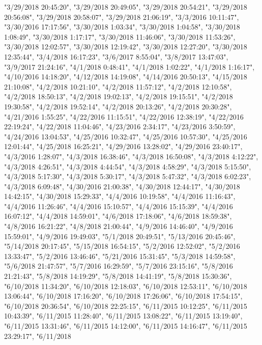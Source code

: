 \documentclass[]{article}
\begin{document}
\begin{itemize}
  "3/29/2018 20:45:20", "3/29/2018 20:49:05", "3/29/2018 20:54:21",
  "3/29/2018 20:56:08", "3/29/2018 20:58:07", "3/29/2018 21:06:19",
  "3/3/2016 10:11:47", "3/30/2016 17:17:56", "3/30/2018 1:03:34",
  "3/30/2018 1:04:58", "3/30/2018 1:08:49", "3/30/2018 1:17:17",
  "3/30/2018 11:46:06", "3/30/2018 11:53:26", "3/30/2018 12:02:57",
  "3/30/2018 12:19:42", "3/30/2018 12:27:20", "3/30/2018 12:35:44",
  "3/4/2018 16:17:23", "3/6/2017 8:55:04", "3/8/2017 13:47:03",
  "3/9/2017 21:24:16", "4/1/2018 0:48:41", "4/1/2018 1:02:22", "4/1/2018
  1:16:17", "4/10/2016 14:18:20", "4/12/2018 14:19:08", "4/14/2016
  20:50:13", "4/15/2018 21:10:08", "4/2/2018 10:21:10", "4/2/2018
  11:57:12", "4/2/2018 12:10:58", "4/2/2018 18:50:13", "4/2/2018
  19:02:13", "4/2/2018 19:15:51", "4/2/2018 19:30:58", "4/2/2018
  19:52:14", "4/2/2018 20:13:26", "4/2/2018 20:30:28", "4/21/2016
  1:55:25", "4/22/2016 11:15:51", "4/22/2016 12:38:19", "4/22/2016
  22:19:24", "4/22/2018 11:04:46", "4/23/2016 2:34:17", "4/23/2016
  3:50:59", "4/24/2016 13:04:53", "4/25/2016 10:32:47", "4/25/2016
  10:57:30", "4/25/2016 12:01:44", "4/25/2018 16:25:21", "4/29/2016
  13:28:02", "4/29/2016 23:40:17", "4/3/2016 1:28:07", "4/3/2018
  16:38:46", "4/3/2018 16:50:08", "4/3/2018 4:12:22", "4/3/2018
  4:26:51", "4/3/2018 4:44:54", "4/3/2018 4:58:29", "4/3/2018 5:15:50",
  "4/3/2018 5:17:30", "4/3/2018 5:30:17", "4/3/2018 5:47:32", "4/3/2018
  6:02:23", "4/3/2018 6:09:48", "4/30/2016 21:00:38", "4/30/2018
  12:44:17", "4/30/2018 14:42:15", "4/30/2018 15:29:33", "4/4/2016
  10:19:58", "4/4/2016 11:16:43", "4/4/2016 11:26:46", "4/4/2016
  15:10:57", "4/4/2016 15:15:39", "4/4/2016 16:07:12", "4/4/2018
  14:59:01", "4/6/2018 17:18:06", "4/6/2018 18:59:38", "4/8/2016
  16:21:22", "4/8/2018 21:00:44", "4/9/2016 14:46:40", "4/9/2016
  15:59:01", "4/9/2016 19:49:03", "5/1/2018 20:49:51", "5/13/2016
  20:45:46", "5/14/2018 20:17:45", "5/15/2018 16:54:15", "5/2/2016
  12:52:02", "5/2/2016 13:33:47", "5/2/2016 13:46:46", "5/21/2016
  15:31:45", "5/3/2018 14:59:58", "5/6/2018 21:47:57", "5/7/2016
  16:29:59", "5/7/2016 23:15:16", "5/8/2016 21:21:43", "5/8/2018
  14:19:29", "5/8/2018 14:41:19", "5/8/2018 15:30:36", "6/10/2018
  11:34:20", "6/10/2018 12:18:03", "6/10/2018 12:53:11", "6/10/2018
  13:06:44", "6/10/2018 17:16:20", "6/10/2018 17:26:06", "6/10/2018
  17:54:15", "6/10/2018 20:36:54", "6/10/2018 22:25:15", "6/11/2015
  10:12:25", "6/11/2015 10:43:39", "6/11/2015 11:28:40", "6/11/2015
  13:08:22", "6/11/2015 13:19:40", "6/11/2015 13:31:46", "6/11/2015
  14:12:00", "6/11/2015 14:16:47", "6/11/2015 23:29:17", "6/11/2018

\end{itemize}
\end{document}
